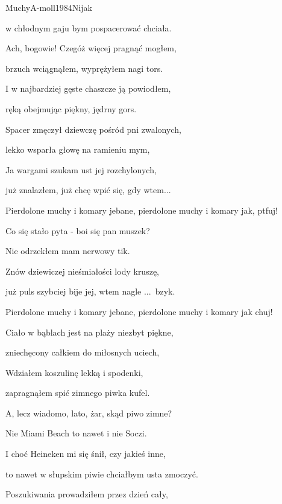 \documentclass[a4paper,draft]{book}
\begin{document}
\begin{song}{Muchy}{A-moll}{1984}{Nijak}{}{}
\begin{SBVerse}
	w chłodnym gaju bym pospacerować chciała.
	\end{SBVerse}
	\begin{SBVerse}
	Ach, bogowie! Czegóż więcej pragnąć mogłem,

	brzuch wciągnąłem, wyprężyłem nagi tors.

	I w najbardziej gęste chaszcze ją powiodłem,

	ręką obejmując piękny, jędrny gors.
	\end{SBVerse}
	\begin{SBVerse}
	Spacer zmęczył dziewczę pośród pni zwalonych,

	lekko wsparła głowę na ramieniu mym,

	Ja wargami szukam ust jej rozchylonych,

	już znalazłem, już chcę wpić się, gdy wtem...
	\end{SBVerse}

	\begin{SBChorus}
	Pierdolone muchy i komary jebane, pierdolone muchy i komary jak, ptfuj!
	\end{SBChorus}

	\begin{SBVerse}
	Co się stało pyta - boi się pan muszek?

	Nie odrzekłem mam nerwowy tik.

	Znów dziewiczej nieśmiałości lody kruszę,

	już puls szybciej bije jej, wtem nagle ...~bzyk.
	\end{SBVerse}

	\begin{SBChorus}
	Pierdolone muchy i komary jebane, pierdolone muchy i komary jak chuj!
	\end{SBChorus}

	\begin{SBVerse}
	Ciało w bąblach jest na plaży niezbyt piękne,

	zniechęcony całkiem do miłosnych uciech,

	Wdziałem koszulinę lekką i spodenki,

	zapragnąłem spić zimnego piwka kufel.
	\end{SBVerse}
	\begin{SBVerse}
	A, lecz wiadomo, lato, żar, skąd piwo zimne?

	Nie Miami Beach to nawet i nie Soczi.

	I choć Heineken mi się śnił, czy jakieś inne,

	to nawet w słupskim piwie chciałbym usta zmoczyć.
	\end{SBVerse}
	\begin{SBVerse}
	Poszukiwania prowadziłem przez dzień cały,


\end{SBVerse}
\end{song}
\end{document}
